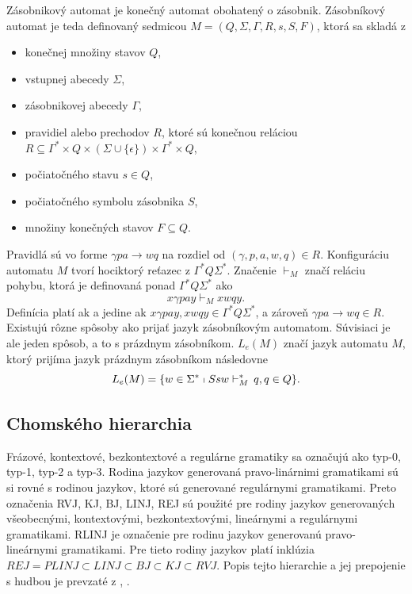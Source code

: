 \begin{definition}
\label{def:zasaut}
Zásobnikový automat je konečný automat obohatený o zásobnik. Zásobníkový automat je teda definovaný sedmicou $M = (Q,\Sigma, \Gamma , R,s,S,F)$, ktorá sa skladá z
\begin{itemize}\itemsep0.05em
    \item konečnej množiny stavov $Q$,
    \item vstupnej abecedy $\Sigma$,
    \item zásobnikovej abecedy $\Gamma$,
    \item pravidiel alebo prechodov $R$, ktoré sú konečnou reláciou $R \subseteq \Gamma^* \times Q \times (\Sigma \cup \{\epsilon\}) \times \Gamma^* \times Q$,
    \item počiatočného stavu $s \in Q$,
    \item počiatočného symbolu zásobnika $S$,
    \item množiny konečných stavov $F \subseteq Q$.
\end{itemize}
Pravidlá sú vo forme $\gamma pa \rightarrow wq$ na rozdiel od $(\gamma , p, a, w, q) \in R$. Konfiguráciu automatu $M$ tvorí hociktorý reťazec z $\Gamma^* Q\Sigma^*$. Značenie $\vdash_M$ značí reláciu pohybu, ktorá je definovaná ponad $\Gamma^* Q\Sigma^*$ ako $$x\gamma pay \vdash_M xwqy.$$ Definícia platí ak a jedine ak $x\gamma pay, xwqy \in \Gamma^* Q\Sigma^*$, a zároveň $\gamma pa \rightarrow wq \in R$. Existujú rôzne spôsoby ako prijať jazyk zásobníkovým automatom. Súvisiaci je ale jeden spôsob, a to s prázdnym zásobníkom. $L_e(M)$ značí jazyk automatu $M$, ktorý prijíma jazyk prázdnym zásobníkom následovne $$L_e(M) = \{w \in \Sigma^* \shortmid Ssw \vdash_M^* \,q,q \in Q\}.$$
\end{definition}

\subsection{Chomského hierarchia}
Frázové, kontextové, bezkontextové a regulárne gramatiky sa označujú ako typ-0, typ-1, typ-2 a typ-3. Rodina jazykov generovaná pravo-linárnimi gramatikami sú si rovné s rodinou jazykov, ktoré sú generované regulárnymi gramatikami. Preto označenia RVJ, KJ, BJ, LINJ, REJ sú použité pre rodiny jazykov generovaných všeobecnými, kontextovými, bezkontextovými, lineárnymi a regulárnymi gramatikami. RLINJ je označenie pre rodinu jazykov generovanú pravo-lineárnymi gramatikami. Pre tieto rodiny jazykov platí inklúzia $REJ = PLINJ \subset LINJ \subset BJ \subset KJ \subset RVJ$. Popis tejto hierarchie a jej prepojenie s hudbou je prevzaté z \cite{jstorgrammusic}, \cite{musicformallang}.

